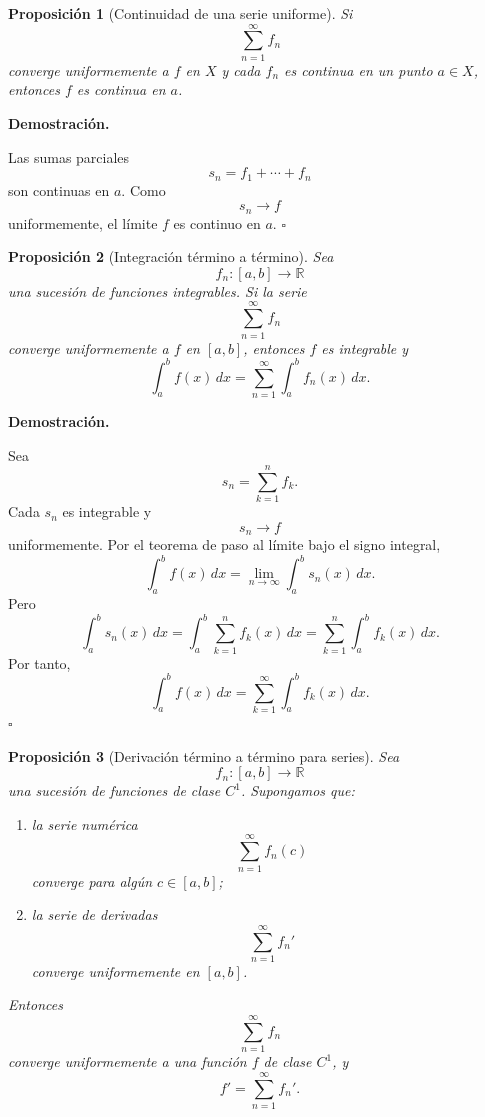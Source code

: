 \documentclass[11pt,a4paper,openany]{book}
\theoremstyle{definition}
\theoremstyle{plain}
\newtheorem{proposicion}{Proposición}[chapter]
\theoremstyle{remark}
\renewenvironment{proof}[1][\textbf{Demostración.}]{%
  \par\noindent #1\ \normalfont
}{\hfill$\square$\par\medskip}
\newcommand{\R}{\mathbb{R}}
\begin{document}
\begin{grisplano}
\begin{proposicion}[Continuidad de una serie uniforme]
Si
\[
    \sum_{n=1}^\infty f_n
\]
converge uniformemente a $f$ en $X$ y cada $f_n$ es continua en un punto
$a\in X$, entonces $f$ es continua en $a$.
\end{proposicion}
\end{grisplano}

\begin{proof}
Las sumas parciales
\[
    s_n=f_1+\cdots+f_n
\]
son continuas en $a$. Como
\[
    s_n\to f
\]
uniformemente, el límite $f$ es continuo en $a$.
\end{proof}

\begin{grisplano}
\begin{proposicion}[Integración término a término]
Sea
\[
    f_n:[a,b]\to\R
\]
una sucesión de funciones integrables. Si la serie
\[
    \sum_{n=1}^{\infty} f_n
\]
converge uniformemente a $f$ en $[a,b]$, entonces $f$ es integrable y
\[
    \int_a^b f(x)\,dx
    =
    \sum_{n=1}^{\infty}\int_a^b f_n(x)\,dx.
\]
\end{proposicion}
\end{grisplano}

\begin{proof}
Sea
\[
    s_n=\sum_{k=1}^n f_k.
\]
Cada $s_n$ es integrable y
\[
    s_n\to f
\]
uniformemente. Por el teorema de paso al límite bajo el signo integral,
\[
    \int_a^b f(x)\,dx
    =
    \lim_{n\to\infty}\int_a^b s_n(x)\,dx.
\]
Pero
\[
    \int_a^b s_n(x)\,dx
    =
    \int_a^b \sum_{k=1}^n f_k(x)\,dx
    =
    \sum_{k=1}^n\int_a^b f_k(x)\,dx.
\]
Por tanto,
\[
    \int_a^b f(x)\,dx
    =
    \sum_{k=1}^{\infty}\int_a^b f_k(x)\,dx.
\]
\end{proof}

\begin{grisplano}
\begin{proposicion}[Derivación término a término para series]
Sea
\[
    f_n:[a,b]\to\R
\]
una sucesión de funciones de clase $C^1$. Supongamos que:

\begin{enumerate}
    \item la serie numérica
    \[
        \sum_{n=1}^{\infty} f_n(c)
    \]
    converge para algún $c\in[a,b]$;

    \item la serie de derivadas
    \[
        \sum_{n=1}^{\infty} f_n'
    \]
    converge uniformemente en $[a,b]$.
\end{enumerate}

Entonces
\[
    \sum_{n=1}^{\infty} f_n
\]
converge uniformemente a una función $f$ de clase $C^1$, y
\[
    f'
    =
    \sum_{n=1}^{\infty} f_n'.
\]
\end{proposicion}
\end{grisplano}
\end{document}
